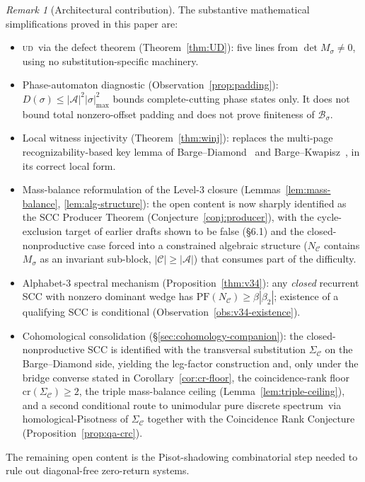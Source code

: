 \documentclass[11pt]{article}
\theoremstyle{plain}
\theoremstyle{definition}
\theoremstyle{remark}
\newtheorem{remark}[theorem]{Remark}
\newcommand{\UD}{\textsc{ud}}
\newcommand{\PDS}{pure discrete spectrum}
\newcommand{\A}{\mathcal{A}}
\newcommand{\B}{\mathcal{B}}
\newcommand{\C}{\mathcal{C}}
\newcommand{\PFroot}{\mathrm{PF}}
\begin{document}
\begin{remark}[Architectural contribution]\label{rem:architecture}
The substantive mathematical simplifications proved in this paper are:
\begin{itemize}[leftmargin=*]
\item \UD\ via the defect theorem (Theorem~\ref{thm:UD}): five lines from $\det M_\sigma\ne 0$, using no substitution-specific machinery.
\item Phase-automaton diagnostic (Observation~\ref{prop:padding}): $D(\sigma)\le|\A|^2|\sigma|_{\max}^2$ bounds complete-cutting phase states only. It does not bound total nonzero-offset padding and does not prove finiteness of $\B_\sigma$.
\item Local witness injectivity (Theorem~\ref{thm:winj}): replaces the multi-page recognizability-based key lemma of Barge--Diamond~\cite{BD} and Barge--Kwapisz~\cite{BK}, in its correct local form.
\item Mass-balance reformulation of the Level-3 closure (Lemmas~\ref{lem:mass-balance}, \ref{lem:alg-structure}): the open content is now sharply identified as the SCC Producer Theorem (Conjecture~\ref{conj:producer}), with the cycle-exclusion target of earlier drafts shown to be false (\S6.1) and the closed-nonproductive case forced into a constrained algebraic structure ($N_\C$ contains $M_\sigma$ as an invariant sub-block, $|\C|\ge|\A|$) that consumes part of the difficulty.
\item Alphabet-$3$ spectral mechanism (Proposition~\ref{thm:v34}): any \emph{closed} recurrent SCC with nonzero dominant wedge has $\PFroot(N_\C)\ge\beta|\beta_2|$; existence of a qualifying SCC is conditional (Observation~\ref{obs:v34-existence}).
\item Cohomological consolidation (\S\ref{sec:cohomology-companion}): the closed-nonproductive SCC is identified with the transversal substitution $\Sigma_\C$ on the Barge--Diamond side, yielding the leg-factor construction and, only under the bridge converse stated in Corollary~\ref{cor:cr-floor}, the coincidence-rank floor $\mathrm{cr}(\Sigma_\C)\ge 2$, the triple mass-balance ceiling (Lemma~\ref{lem:triple-ceiling}), and a second conditional route to unimodular \PDS\ via homological-Pisotness of $\Sigma_\C$ together with the Coincidence Rank Conjecture (Proposition~\ref{prop:qa-crc}).
\end{itemize}
The remaining open content is the Pisot-shadowing combinatorial step needed to rule out diagonal-free zero-return systems.
\end{remark}
\end{document}
